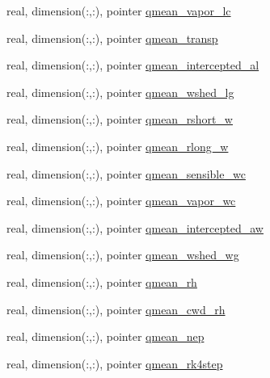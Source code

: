 \begin{DoxyCompactItemize}
\item 
real, dimension(\+:,\+:), pointer \hyperlink{structed__state__vars_1_1edtype_aefee62625832efba819b0b2aaf5c9c50}{qmean\+\_\+vapor\+\_\+lc}
\item 
real, dimension(\+:,\+:), pointer \hyperlink{structed__state__vars_1_1edtype_afcbf1484eefce7dbe026ac3fc1ee1f69}{qmean\+\_\+transp}
\item 
real, dimension(\+:,\+:), pointer \hyperlink{structed__state__vars_1_1edtype_ad6eaefabbe40ad63d3a3e399b705620c}{qmean\+\_\+intercepted\+\_\+al}
\item 
real, dimension(\+:,\+:), pointer \hyperlink{structed__state__vars_1_1edtype_af54fe25afe4834f08d4052ac9ec7df8e}{qmean\+\_\+wshed\+\_\+lg}
\item 
real, dimension(\+:,\+:), pointer \hyperlink{structed__state__vars_1_1edtype_ad7b144e587e4d70c61e377f84b68c821}{qmean\+\_\+rshort\+\_\+w}
\item 
real, dimension(\+:,\+:), pointer \hyperlink{structed__state__vars_1_1edtype_acefa32d15e8b4fbea8c5ba192c401986}{qmean\+\_\+rlong\+\_\+w}
\item 
real, dimension(\+:,\+:), pointer \hyperlink{structed__state__vars_1_1edtype_ac95129719656a4d7c2438a85bdae2f04}{qmean\+\_\+sensible\+\_\+wc}
\item 
real, dimension(\+:,\+:), pointer \hyperlink{structed__state__vars_1_1edtype_a48604fd52bbcf15c04c02865249cce5a}{qmean\+\_\+vapor\+\_\+wc}
\item 
real, dimension(\+:,\+:), pointer \hyperlink{structed__state__vars_1_1edtype_a3a5eee657a806b04e8078c456a9f9291}{qmean\+\_\+intercepted\+\_\+aw}
\item 
real, dimension(\+:,\+:), pointer \hyperlink{structed__state__vars_1_1edtype_a8831c5811509e974dfeb0adced317f3d}{qmean\+\_\+wshed\+\_\+wg}
\item 
real, dimension(\+:,\+:), pointer \hyperlink{structed__state__vars_1_1edtype_adc9f49094ff5ceebf7a321f2faa73826}{qmean\+\_\+rh}
\item 
real, dimension(\+:,\+:), pointer \hyperlink{structed__state__vars_1_1edtype_ac50a4bd722c83a1cd3739aa9fa7111e5}{qmean\+\_\+cwd\+\_\+rh}
\item 
real, dimension(\+:,\+:), pointer \hyperlink{structed__state__vars_1_1edtype_a792fd95ab10d7ced0d2b9093ccb4ff91}{qmean\+\_\+nep}
\item 
real, dimension(\+:,\+:), pointer \hyperlink{structed__state__vars_1_1edtype_afcdaaf3eea6fa8433915dd8612843f54}{qmean\+\_\+rk4step}
\item 

\end{DoxyCompactItemize}
